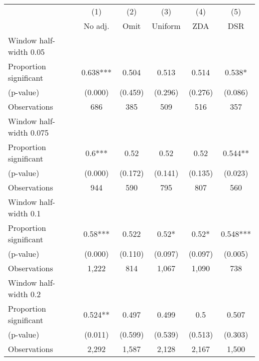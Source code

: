 
\def\sym#1{\ifmmode^{#1}\else\(^{#1}\)\fi}
\begin{tabular}{l*{5}{c}}
\hline\hline
& \multicolumn{1}{c}{(1)} &  \multicolumn{1}{c}{(2)} &  \multicolumn{1}{c}{(3)} &  \multicolumn{1}{c}{(4)} &  \multicolumn{1}{c}{(5)}\\
& \multicolumn{1}{c}{No adj.} &  \multicolumn{1}{c}{Omit} &  \multicolumn{1}{c}{Uniform} &  \multicolumn{1}{c}{ZDA} &  \multicolumn{1}{c}{DSR}\\

\hline
\hline
Window half-width 0.05\\

Proportion significant& 0.638*** &  0.504 &  0.513 &  0.514 &  0.538*\\

(p-value) & (0.000) &  (0.459) &  (0.296) &  (0.276) &  (0.086)\\

Observations& 686 &  385 &  509 &  516 &  357\\

\hline
Window half-width 0.075\\

Proportion significant& 0.6*** &  0.52 &  0.52 &  0.52 &  0.544**\\

(p-value) & (0.000) &  (0.172) &  (0.141) &  (0.135) &  (0.023)\\

Observations& 944 &  590 &  795 &  807 &  560\\

\hline
Window half-width 0.1\\

Proportion significant& 0.58*** &  0.522 &  0.52* &  0.52* &  0.548***\\

(p-value) & (0.000) &  (0.110) &  (0.097) &  (0.097) &  (0.005)\\

Observations& 1,222 &  814 &  1,067 &  1,090 &  738\\

\hline
Window half-width 0.2\\

Proportion significant& 0.524** &  0.497 &  0.499 &  0.5 &  0.507\\

(p-value) & (0.011) &  (0.599) &  (0.539) &  (0.513) &  (0.303)\\

Observations& 2,292 &  1,587 &  2,128 &  2,167 &  1,500\\


\end{tabular}

